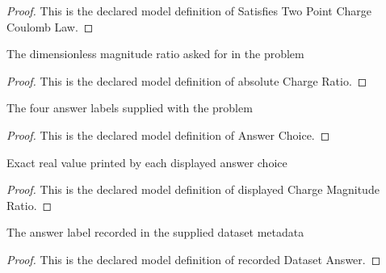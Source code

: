\begin{proof}
  This is the declared model definition of Satisfies Two Point Charge Coulomb Law.
\end{proof}
\begin{definition}
  \label{def:physics:phyx-mini-0861:phyxminiproblems-problemphyxmini0861-absolutechargeratio}
  The dimensionless magnitude ratio asked for in the problem
\end{definition}
\begin{proof}
  This is the declared model definition of absolute Charge Ratio.
\end{proof}
\begin{definition}
  \label{def:physics:phyx-mini-0861:phyxminiproblems-problemphyxmini0861-answerchoice}
  The four answer labels supplied with the problem
\end{definition}
\begin{proof}
  This is the declared model definition of Answer Choice.
\end{proof}
\begin{definition}
  \label{def:physics:phyx-mini-0861:phyxminiproblems-problemphyxmini0861-answerchoice-displayedchargemagnituderatio}
  Exact real value printed by each displayed answer choice
\end{definition}
\begin{proof}
  This is the declared model definition of displayed Charge Magnitude Ratio.
\end{proof}
\begin{definition}
  \label{def:physics:phyx-mini-0861:phyxminiproblems-problemphyxmini0861-recordeddatasetanswer}
  The answer label recorded in the supplied dataset metadata
\end{definition}
\begin{proof}
  This is the declared model definition of recorded Dataset Answer.
\end{proof}
